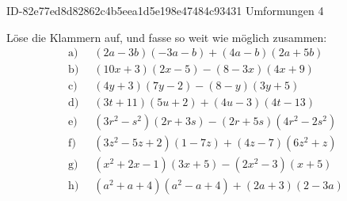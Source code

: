 \begin{exercise}
      {ID-82e77ed8d82862c4b5eea1d5e198e47484c93431}
      {Umformungen 4}
  \ifproblem\problem\par
    \newcommand{\gap}{\;\;}%
    Löse die Klammern auf, und fasse so weit wie möglich zusammen:
    \begin{equation*}
      \begin{split}
        \text{a)}\gap & (2a-3b)(-3a-b)+(4a-b)(2a+5b) \\
        \text{b)}\gap & (10x+3)(2x-5)-(8-3x)(4x+9) \\
        \text{c)}\gap & (4y+3)(7y-2)-(8-y)(3y+5) \\
        \text{d)}\gap & (3t+11)(5u+2)+(4u-3)(4t-13) \\
        \text{e)}\gap & (3r^2-s^2)(2r+3s)-(2r+5s)(4r^2-2s^2) \\
        \text{f)}\gap & (3z^2-5z+2)(1-7z)+(4z-7)(6z^2+z) \\
        \text{g)}\gap & (x^2+2x-1)(3x+5)-(2x^2-3)(x+5) \\
        \text{h)}\gap & (a^2+a+4)(a^2-a+4)+(2a+3)(2-3a)
      \end{split}
    \end{equation*}
  \fi
  \ifoutcome\outcome\par
    \newcommand{\toprow}[2][20em]
    {%
      \makebox[#1][l]
      {%
        \ensuremath
        {%
          \displaystyle
          \phantom{\,=\:\,}%
          #2%
        }%
      }%
    }%
    \newcommand{\solutionA}[1]
    {%
      \begin{equation*}
        \begin{split}
          \text{a)} &\toprow[#1]{(2a-3b)(-3a-b)+(4a-b)(2a+5b)}         \\
                    &=           -6a^2-2ab+9ab+3b^2+8a^2+20ab-2ab-5b^2 \\
                    &=           -6a^2+8a^2-2ab+9ab+20ab-2ab+3b^2-5b^2 \\
                    &=           2a^2+25ab+-2b^2
        \end{split}
      \end{equation*}
    }%
    \newcommand{\solutionB}[1]
    {%
      \begin{equation*}
        \begin{split}
          \text{b)} &\toprow[#1]{(10x+3)(2x-5)-(8-3x)(4x+9)}                   \\

\end{split}
\end{equation*}}
\end{exercise}

